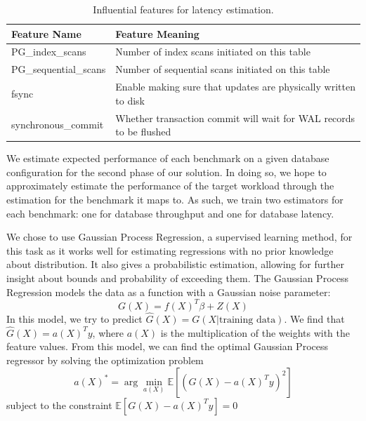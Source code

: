 \begin{table}[h!]
  \centering
  \begin{adjustbox}{max width=0.85\textwidth}
    \begin{tabular}{ll}
      \toprule
      Feature Name          & Feature Meaning                                                    \\
      \midrule
      PG\_index\_scans      & Number of index scans initiated on this table                      \\
      PG\_sequential\_scans & Number of sequential scans initiated on this table                 \\
      fsync                 & Enable making sure that updates are physically written to disk     \\
      synchronous\_commit   & Whether transaction commit will wait for WAL records to be flushed \\
      \bottomrule
    \end{tabular}
  \end{adjustbox}

  \caption{Influential features for latency estimation.}
  \label{tab:influential_features_for_latency}
\end{table}

We estimate expected performance of each benchmark on a given database
configuration for the second phase of our solution. In doing so, we
hope to approximately estimate the performance of the target workload
through the estimation for the benchmark it maps to. As such, we train
two estimators for each benchmark: one for database throughput and one
for database latency.

We chose to use Gaussian Process Regression, a supervised learning
method, for this task as it works well for estimating regressions with
no prior knowledge about distribution. It also gives a probabilistic
estimation, allowing for further insight about bounds and probability
of exceeding them. The Gaussian Process Regression models the data as
a function with a Gaussian noise parameter:
\begin{equation*}
G(X) = f(X)^T\beta + Z(X)
\end{equation*}
In this model, we try to predict
$\hat{G}(X) = G(X|\textrm{training data})$. We find that
$\hat{G}(X) = a(X)^Ty$, where $a(X)$ is the multiplication of the
weights with the feature values. From this model, we can find the
optimal Gaussian Process regressor by solving the optimization problem
\begin{equation*}
a(X)^* = \arg \min\limits_{a(X)} \mathbb{E}[(G(X) - a(X)^T y)^2]
\end{equation*}
subject to the constraint $\mathbb{E}[G(X) - a(X)^T y] = 0$

